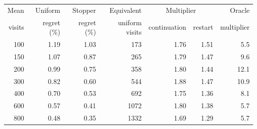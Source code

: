 \begin{tabular}{rrrrrrr}
\toprule
Mean & Uniform & Stopper & Equivalent & \multicolumn{2}{c}{Multiplier} & Oracle \\
visits & regret (\%) & regret (\%) & uniform visits & continuation & restart & multiplier \\
\midrule
100 & 1.19 & 1.03 & 173 & 1.76 & 1.51 & 5.5 \\
150 & 1.07 & 0.87 & 265 & 1.79 & 1.47 & 9.6 \\
200 & 0.99 & 0.75 & 358 & 1.80 & 1.44 & 12.1 \\
300 & 0.82 & 0.60 & 544 & 1.88 & 1.47 & 10.9 \\
400 & 0.70 & 0.53 & 692 & 1.75 & 1.36 & 8.1 \\
600 & 0.57 & 0.41 & 1072 & 1.80 & 1.38 & 5.7 \\
800 & 0.48 & 0.35 & 1332 & 1.69 & 1.29 & 5.7 \\
\bottomrule
\end{tabular}
